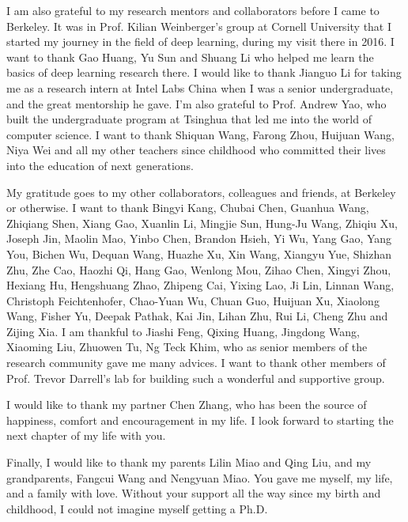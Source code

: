 \documentclass{ucbthesis}
\begin{document}
\begin{frontmatter}
\begin{acknowledgements}
I am also grateful to my research mentors and collaborators before I came to Berkeley. It was in Prof. Kilian Weinberger's group at Cornell University that I started my journey in the field of deep learning, during my visit there in 2016. I want to thank Gao Huang, Yu Sun and Shuang Li who helped me learn the basics of deep learning research there. I would like to thank Jianguo Li for taking me as a research intern at Intel Labs China when I was a senior undergraduate, and the great mentorship he gave. I'm also grateful to Prof. Andrew Yao, who built the undergraduate program at Tsinghua that led me into the world of computer science. I want to thank Shiquan Wang, Farong Zhou, Huijuan Wang, Niya Wei and all my other teachers since childhood who committed their lives into the education of next generations.

My gratitude goes to my other collaborators, colleagues and friends, at Berkeley or otherwise. I want to thank Bingyi Kang, Chubai Chen, Guanhua Wang, Zhiqiang Shen, Xiang Gao, 
Xuanlin Li, Mingjie Sun, Hung-Ju Wang, Zhiqiu Xu, Joseph Jin, Maolin Mao, Yinbo Chen, Brandon Hsieh, 
Yi Wu, Yang Gao, Yang You, Bichen Wu, Dequan Wang, Huazhe Xu, Xin Wang, Xiangyu Yue, Shizhan Zhu, Zhe Cao, Haozhi Qi, Hang Gao, Wenlong Mou, Zihao Chen, 
Xingyi Zhou, Hexiang Hu, Hengshuang Zhao, Zhipeng Cai, Yixing Lao, Ji Lin, Linnan Wang, 
Christoph Feichtenhofer, Chao-Yuan Wu, Chuan Guo, Huijuan Xu, Xiaolong Wang, Fisher Yu, Deepak Pathak,
 Kai Jin, Lihan Zhu, Rui Li, Cheng Zhu and Zijing Xia.
 I am thankful to Jiashi Feng, Qixing Huang, Jingdong Wang, Xiaoming Liu, Zhuowen Tu, Ng Teck Khim, who as senior members of the research community gave me many advices. I want to thank other members of Prof. Trevor Darrell's lab for building such a wonderful and supportive group.

 I would like to thank my partner Chen Zhang, who has been the source of happiness, comfort and encouragement in my life. I look forward to starting the next chapter of my life with you.


Finally, I would like to thank my parents Lilin Miao and Qing Liu, and my grandparents, Fangcui Wang and Nengyuan Miao. You gave me myself, my life, and a family with love. Without your support all the way since my birth and childhood, I could not imagine myself getting a Ph.D.




\end{acknowledgements}

\end{frontmatter}
\end{document}

